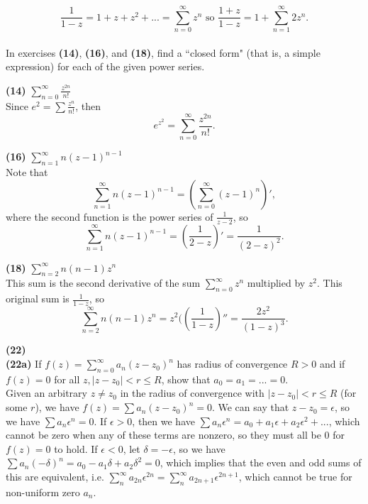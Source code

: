\documentclass[12pt,letterpaper]{article}
\begin{document}
\[\frac{1}{1-z} = 1 + z + z^{2} + ... = \sum_{n=0}^{\infty} z^{n} \text{ so } \frac{1+z}{1-z} = 1 + \sum_{n=1}^{\infty} 2z^{n}.\] \\

In exercises \textbf{(14)}, \textbf{(16)}, and \textbf{(18)}, find a ``closed form" (that is, a simple expression) for each of the given power series. 

\textbf{(14)} \(\sum_{n=0}^{\infty} \frac{z^{2n}}{n!}\) \\

Since \(e^{2} = \sum \frac{z^{n}}{n!}\), then \[e^{z^{2}} = \sum_{n=0}^{\infty} \frac{z^{2n}}{n!}.\]

\textbf{(16)} \(\sum_{n=1}^{\infty} n(z-1)^{n-1} \) \\

Note that \[\sum_{n=1}^{\infty} n(z-1)^{n-1} = \left(\sum_{n=0}^{\infty} (z-1)^{n} \right)',\] where the second function is the power series of \(\frac{1}{z-2}\), so \[\sum_{n=1}^{\infty} n(z-1)^{n-1} = \left(\frac{1}{2-z}\right)' = \frac{1}{(2-z)^{2}}.\]

\textbf{(18)} \(\sum_{n = 2}^{\infty} n(n-1)z^{n} \) \\

This sum is the second derivative of the sum \(\sum_{n=0}^{\infty} z^{n}\) multiplied by \(z^{2}\). This original sum is \(\frac{1}{1-z}\), so \[\sum_{n = 2}^{\infty} n(n-1)z^{n} = z^{2}(\left( \frac{1}{1-z} \right)'' = \frac{2z^{2}}{(1-z)^{3}}. \]

\textbf{(22)} \\

\textbf{(22a)} If \(f(z) = \sum_{n=0}^{\infty} a_{n}(z-z_{0})^{n}\) has radius of convergence \(R > 0 \) and if \(f(z) = 0\) for all \(z, |z-z_{0}| < r \leq R \), show that \(a_{0} = a_{1} = ... = 0\). \\

Given an arbitrary \(z \neq z_{0}\) in the radius of convergence with \(|z - z_{0}| < r \leq R\) (for some \(r\)), we have \(f(z) = \sum a_{n} (z-z_{0})^{n} = 0\). We can say that \(z-z_{0} = \epsilon\), so we have \(\sum a_{n} \epsilon^{n} = 0\). If \(\epsilon > 0\), then we have \(\sum a_{n} \epsilon^{n} = a_{0} + a_{1} \epsilon + a_{2} \epsilon^{2} + ...\), which cannot be zero when any of these terms are nonzero, so they must all be \(0\) for \(f(z) = 0\) to hold. If \(\epsilon < 0\), let \(\delta = -\epsilon\), so we have \(\sum a_{n} (-\delta)^{n} = a_{0} - a_{1} \delta + a_{2} \delta^{2} = 0\), which implies that the even and odd sums of this are equivalent, i.e. \(\sum_{n}^{\infty} a_{2n} \epsilon^{2n} = \sum_{n}^{\infty} a_{2n+1} \epsilon^{2n+1}\), which cannot be true for non-uniform zero \(a_{n}\). \\
\end{document}
